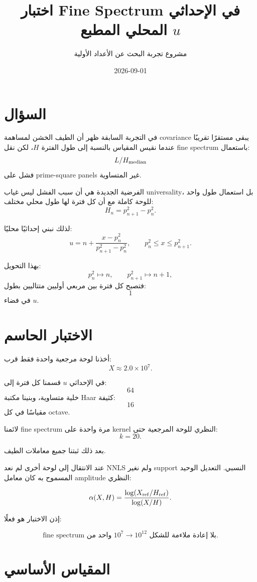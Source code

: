 \documentclass[12pt]{article}
\title{اختبار Fine Spectrum في الإحداثي المحلي المطبع \(u\)}
\author{مشروع تجربة البحث عن الأعداد الأولية}
\date{2026-09-01}
\begin{document}
\maketitle

\section{السؤال}

في التجربة السابقة ظهر أن الطيف الخشن لمساهمة covariance يبقى مستقرًا تقريبًا
عندما نقيس المقياس بالنسبة إلى طول الفترة \(H\)، لكن نقل fine spectrum
باستعمال:
\[
L/H_{\rm median}
\]
فشل على prime-square panels غير المتساوية.

الفرضية الجديدة هي أن سبب الفشل ليس غياب universality، بل استعمال طول واحد
للوحة كاملة مع أن كل فترة لها طول محلي مختلف:
\[
H_n=p_{n+1}^2-p_n^2.
\]

لذلك نبني إحداثيًا محليًا:
\[
u
=
n+
\frac{x-p_n^2}
{p_{n+1}^2-p_n^2},
\qquad
p_n^2\le x\le p_{n+1}^2.
\]

بهذا التحويل:
\[
p_n^2\longmapsto n,
\qquad
p_{n+1}^2\longmapsto n+1,
\]
فتصبح كل فترة بين مربعي أوليين متتاليين بطول:
\[
1
\]
في فضاء \(u\).

\section{الاختبار الحاسم}

أخذنا لوحة مرجعية واحدة فقط قرب:
\[
X\approx2.0\times10^7.
\]

في الإحداثي \(u\) قسمنا كل فترة إلى:
\[
64
\]
خلية متساوية، وبنينا مكتبة Haar كثيفة:
\[
16
\]
مقياسًا في كل octave.

لائمنا fine spectrum مرة واحدة على kernel النظري للوحة المرجعية حتى:
\[
k=20.
\]

بعد ذلك ثبتنا جميع معاملات الطيف.

عند الانتقال إلى لوحة أخرى لم نعد NNLS ولم نغير support النسبي.
التعديل الوحيد المسموح به كان معامل amplitude النظري:

\[
\alpha(X,H)
=
\frac{
\log(X_{\rm ref}/H_{\rm ref})
}{
\log(X/H)
}.
\]

إذن الاختبار هو فعلًا:

\[
\boxed{
\text{fine spectrum واحد من }10^7
\longrightarrow
10^{12}
\text{ بلا إعادة ملاءمة للشكل.}
}
\]

\section{المقياس الأساسي}
\end{document}
